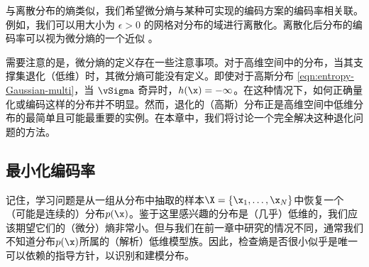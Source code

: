 \documentclass[../../book-main.tex]{subfiles}
\begin{document}
与离散分布的熵类似，我们希望微分熵与某种可实现的编码方案的编码率相关联。例如，我们可以用大小为 $\epsilon >0$ 的网格对分布的域进行离散化。离散化后分布的编码率可以视为微分熵的一个近似 \cite{Cover-Thomas}。

需要注意的是，微分熵的定义存在一些注意事项。对于高维空间中的分布，当其支撑集退化（低维）时，其微分熵可能没有定义。即使对于高斯分布 \eqref{eqn:entropy-Gaussian-multi}，当 \(\vSigma\) 奇异时，$h(\x) = -\infty$。在这种情况下，如何正确量化或编码这样的分布并不明显。然而，退化的（高斯）分布正是高维空间中低维分布的最简单且可能最重要的实例。在本章中，我们将讨论一个完全解决这种退化问题的方法。


\subsection{最小化编码率}\label{sub:min_entropy}
记住，学习问题是从一组从分布中抽取的样本$\X = \{\x_1, \ldots, \x_N\}$中恢复一个（可能是连续的）分布$p(\x)$。鉴于这里感兴趣的分布是（几乎）低维的，我们应该期望它们的（微分）熵非常小。但与我们在前一章中研究的情况不同，通常我们不知道分布$p(\x)$所属的（解析）低维模型族。因此，检查熵是否很小似乎是唯一可以依赖的指导方针，以识别和建模分布。
\end{document}
